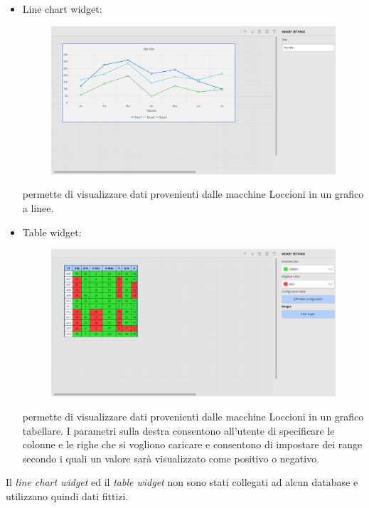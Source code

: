 \begin{itemize}
    \item Line chart widget: 
    
\begin{figure}[ht]
\centering
\includegraphics[scale=0.32]{images/Linechart.JPG}
\end{figure}
permette di visualizzare dati provenienti dalle macchine Loccioni in un grafico a linee.
\end{itemize}

\pagebreak
\begin{itemize}
    \item Table widget: 
    
\begin{figure}[ht]
\centering
\includegraphics[scale=0.35]{images/Table.png}
\end{figure}
permette di visualizzare dati provenienti dalle macchine Loccioni in un grafico tabellare. I parametri sulla destra consentono all'utente di specificare le colonne e le righe che si vogliono caricare e consentono di impostare dei range secondo i quali un valore sarà visualizzato come positivo o negativo.
\end{itemize}
Il \textit{line chart widget} ed il \textit{table widget} non sono stati collegati ad alcun database e utilizzano quindi dati fittizi.